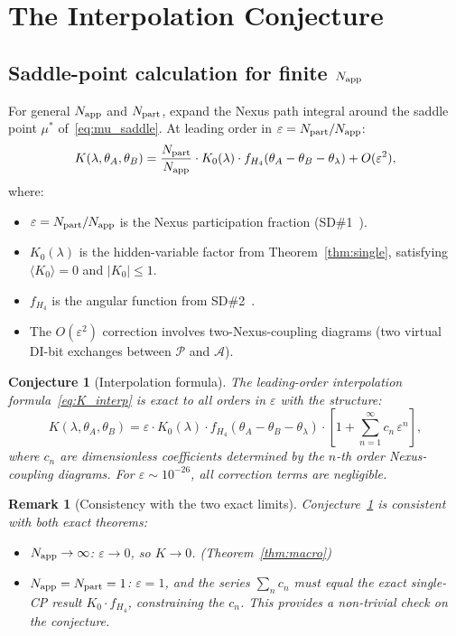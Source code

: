 \documentclass[11pt,a4paper]{article}
\newtheorem{conjecture}[theorem]{Conjecture}
\newtheorem{remark}[theorem]{Remark}
\newcommand{\eps}{\varepsilon}
\newcommand{\Napp}{N_{\rm app}}
\newcommand{\Npart}{N_{\rm part}}
\begin{document}
\section{The Interpolation Conjecture}
\label{sec:interpolation}

\subsection{Saddle-point calculation for finite $\Napp$}

For general $\Napp$ and $\Npart$, expand the Nexus path integral
around the saddle point $\mu^*$ of~\eqref{eq:mu_saddle}.  At
leading order in $\eps = \Npart/\Napp$:
\begin{equation}
K(\lambda,\theta_A,\theta_B)
= \frac{\Npart}{\Napp}
  \cdot K_0(\lambda)
  \cdot f_{H_4}(\theta_A - \theta_B - \theta_\lambda)
  + O(\eps^2),
\label{eq:K_interp}
\end{equation}
where:
\begin{itemize}
\item $\eps = \Npart/\Napp$ is the Nexus participation fraction
  (SD\#1~\citep{cpp_sd1}).
\item $K_0(\lambda)$ is the hidden-variable factor from
  Theorem~\ref{thm:single}, satisfying $\langle K_0\rangle = 0$
  and $|K_0| \leq 1$.
\item $f_{H_4}$ is the angular function from SD\#2~\citep{cpp_sd2}.
\item The $O(\eps^2)$ correction involves two-Nexus-coupling
  diagrams (two virtual DI-bit exchanges between $\mathcal{P}$ and
  $\mathcal{A}$).
\end{itemize}

\begin{conjecture}[Interpolation formula]
\label{conj:interpolation}
The leading-order interpolation formula~\eqref{eq:K_interp} is
exact to all orders in $\eps$ with the structure:
\begin{equation}
K(\lambda,\theta_A,\theta_B)
= \eps \cdot K_0(\lambda) \cdot f_{H_4}(\theta_A-\theta_B-\theta_\lambda)
  \cdot \left[1 + \sum_{n=1}^{\infty} c_n\,\eps^n\right],
\label{eq:K_full}
\end{equation}
where $c_n$ are dimensionless coefficients determined by the
$n$-th order Nexus-coupling diagrams.  For $\eps \sim 10^{-26}$,
all correction terms are negligible.
\end{conjecture}

\begin{remark}[Consistency with the two exact limits]
Conjecture~\ref{conj:interpolation} is consistent with both
exact theorems:
\begin{itemize}
\item $\Napp \to \infty$: $\eps \to 0$, so $K \to 0$.
  \checkmark (Theorem~\ref{thm:macro})
\item $\Napp = \Npart = 1$: $\eps = 1$, and the series
  $\sum_n c_n$ must equal the exact single-CP result
  $K_0\cdot f_{H_4}$, constraining the $c_n$.  This provides
  a non-trivial check on the conjecture.
\end{itemize}
\end{remark}
\end{document}
